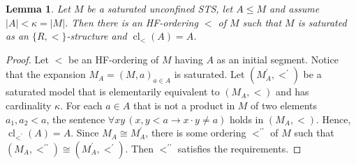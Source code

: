 \documentclass[10pt,a4paper]{article}
\DeclareMathOperator{\cl}{cl}
\theoremstyle{note}
\newtheorem{lemma}[thm]{Lemma}
\begin{document}
\begin{lemma}\label{May_2025}
	Let $M$ be a saturated unconfined STS, let $A\leq M$ and assume $|A|<\kappa =|M|$. Then there is an HF-ordering $<$ of $M$ such that $M$ is saturated as an $\{R,<\}$-structure and $\cl_<(A)=A$.
\end{lemma}

\begin{proof}
	Let $<$ be an HF-ordering of $M$ having $A$ as an initial segment. Notice that the expansion $M_A= (M,a)_{a\in A}$ is saturated. Let $(M^\prime_A,<^\prime)$ be a saturated model that is elementarily equivalent to $(M_A,<)$ and has cardinality $\kappa$. For each $a\in A$ that is not a product in $M$ of two elements $a_1,a_2<a$, the sentence $\forall xy \, (x,y<a\rightarrow x\cdot y \neq a)$ holds in $(M_A,<)$. Hence, $\cl_{<^\prime}(A)=A$. Since $M_A\cong M^\prime_A$, there is some ordering $<^{\prime\prime}$ of $M$ such that $(M_A,<^{\prime\prime})\cong (M^\prime_A,<^\prime)$. Then $<^{\prime\prime}$ satisfies the requirements.
\end{proof}
\end{document}
